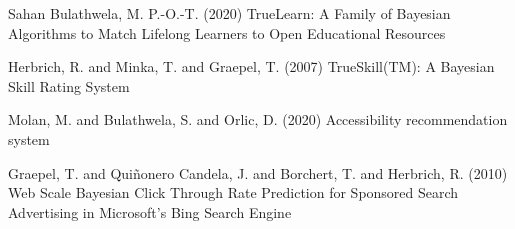 \documentclass{article}
\begin{document}
\begin{thebibliography}{99} %
Sahan Bulathwela, M. P.-O.-T. (2020)
\newblock TrueLearn: A Family of Bayesian Algorithms to Match Lifelong Learners to Open Educational Resources

Herbrich, R. and Minka, T. and Graepel, T. (2007)
\newblock TrueSkill(TM): A Bayesian Skill Rating System

Molan, M. and Bulathwela, S. and Orlic, D. (2020)
\newblock Accessibility recommendation system

Graepel, T. and Quiñonero Candela, J. and Borchert, T. and Herbrich, R. (2010)
\newblock Web Scale Bayesian Click Through Rate Prediction for Sponsored Search Advertising in Microsoft’s Bing Search Engine 

\end{thebibliography}

\end{document}
